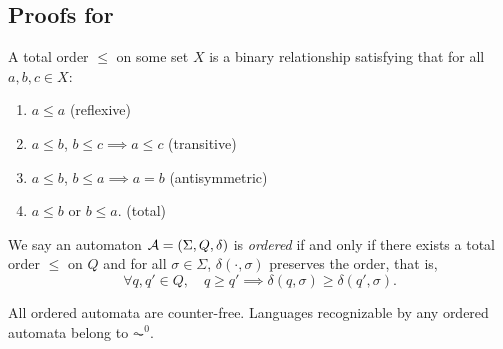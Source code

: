 \subsection{Proofs for }\label{appsec:AC0_upper_bound}
\begin{definition}
	A total order $\le$ on some set $X$ is a binary relationship satisfying that for all $a,b,c\in X$:
	\begin{enumerate}
		\item $a\le a$ (reflexive)
		\item $a\le b$, $b\le c \implies a\le c$ (transitive)
		\item $a\le b$, $b\le a \implies a =b$ (antisymmetric)
		\item $a\le b$ or $b\le a$. (total)
	\end{enumerate}
\end{definition}
\begin{definition}\label{defi:ordered_automaton}
	We say an automaton ${\mathcal{A}} = (\Sigma,Q,\delta)$ is \emph{ordered} if and only if there exists a total order $\le$ on $Q$ and for all $\sigma\in\Sigma$, $\delta(\cdot,\sigma)$ preserves the order, that is,  $$\forall q,q'\in Q, \quad q\ge q' \implies \delta(q,\sigma)\ge \delta(q',\sigma).$$
\end{definition}

\begin{theorem}\label{thm:ordered_automata_counter_free}
	All ordered automata are counter-free. Languages recognizable by any ordered automata belong to $\AC^0$.
\end{theorem}

